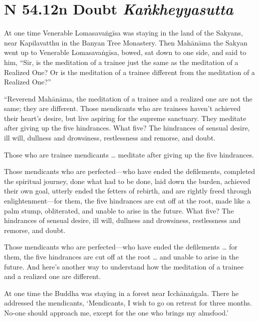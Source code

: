 \documentclass[12pt,openany]{book}%
\newcommand*{\suttatitleacronym}[1]{\smaller[2]{#1}\vspace*{.3em}}
\newcommand*{\suttatitletranslation}[1]{\linebreak{#1}}
\newcommand*{\suttatitleroot}[1]{\linebreak\smaller[2]\itshape{#1}}
\newcommand*{\tocacronym}[1]{\hspace*{-3.3em}{#1}\quad}
\newcommand*{\toctranslation}[1]{#1}
\newcommand*{\tocroot}[1]{(\textit{#1})}
\begin{document}
%
\section*{{\suttatitleacronym SN 54.12}{\suttatitletranslation In Doubt }{\suttatitleroot Kaṅkheyyasutta}}
\addcontentsline{toc}{section}{\tocacronym{SN 54.12} \toctranslation{In Doubt } \tocroot{Kaṅkheyyasutta}}

At one time Venerable \textsanskrit{Lomasavaṅgīsa} was staying in the land of the Sakyans, near Kapilavatthu in the Banyan Tree Monastery. Then \textsanskrit{Mahānāma} the Sakyan went up to Venerable \textsanskrit{Lomasavaṅgīsa}, bowed, sat down to one side, and said to him, “Sir, is the meditation of a trainee just the same as the meditation of a Realized One? Or is the meditation of a trainee different from the meditation of a Realized One?” 

“Reverend \textsanskrit{Mahānāma}, the meditation of a trainee and a realized one are not the same; they are different. Those mendicants who are trainees haven’t achieved their heart’s desire, but live aspiring for the supreme sanctuary. They meditate after giving up the five hindrances. What five? The hindrances of sensual desire, ill will, dullness and drowsiness, restlessness and remorse, and doubt. 

Those who are trainee mendicants … meditate after giving up the five hindrances. 

Those mendicants who are perfected—who have ended the defilements, completed the spiritual journey, done what had to be done, laid down the burden, achieved their own goal, utterly ended the fetters of rebirth, and are rightly freed through enlightenment—for them, the five hindrances are cut off at the root, made like a palm stump, obliterated, and unable to arise in the future. What five? The hindrances of sensual desire, ill will, dullness and drowsiness, restlessness and remorse, and doubt. 

Those mendicants who are perfected—who have ended the defilements … for them, the five hindrances are cut off at the root … and unable to arise in the future. And here’s another way to understand how the meditation of a trainee and a realized one are different. 

At one time the Buddha was staying in a forest near \textsanskrit{Icchānaṅgala}. There he addressed the mendicants, ‘Mendicants, I wish to go on retreat for three months. No-one should approach me, except for the one who brings my almsfood.’ 
\end{document}
